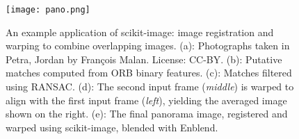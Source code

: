 
\begin{figure}
\texttt{[image: pano.png]}
\caption{An example application of scikit-image: image registration and warping to combine overlapping images. (a): Photographs taken in Petra, Jordan by François Malan. License: CC-BY. (b): Putative matches computed from ORB binary features. (c): Matches filtered using RANSAC. (d): The second input frame (\textit{middle}) is warped to align with the first input frame (\textit{left}), yielding the averaged image shown on the right. (e): The final panorama image, registered and warped using scikit-image, blended with Enblend.\label{fig:pano}}

\end{figure}
